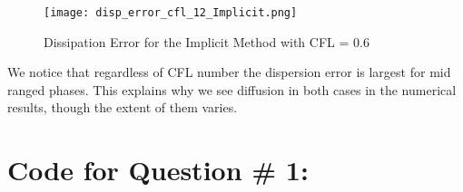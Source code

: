 \documentclass[a4paper,12pt,titlepage]{article}
\newcommand{\scale}{0.5}
\begin{document}
\begin{figure}[H]
  \begin{center}
    \texttt{[image: disp\_error\_cfl\_12\_Implicit.png]}
    \caption{Dissipation Error for the Implicit Method with CFL = 0.6}
  \end{center}
\end{figure}

We notice that regardless of CFL number the dispersion error is largest for mid ranged phases.  This explains why we see diffusion in both cases in the numerical results, though the extent of them varies.

\appendix

\newcommand{\appsection}[1]{\let\oldthesection\thesection
  \renewcommand{\thesection}{Appendix \oldthesection}
  \section{#1}\let\thesection\oldthesection}

\appsection{Code for Question \# 1:}
\end{document}

